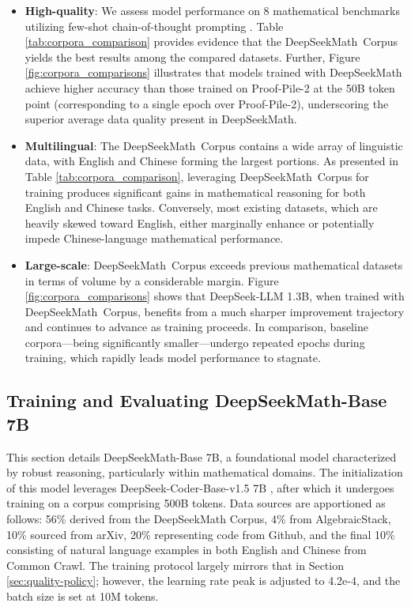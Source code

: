 \begin{itemize}[topsep=0pt]
    \item \textbf{High-quality}:
    We assess model performance on 8 mathematical benchmarks utilizing few-shot chain-of-thought prompting \cite{cot}. Table \ref{tab:corpora_comparison} provides evidence that the DeepSeekMath~Corpus yields the best results among the compared datasets. Further, Figure \ref{fig:corpora_comparisons} illustrates that models trained with DeepSeekMath achieve higher accuracy than those trained on Proof-Pile-2 at the 50B token point (corresponding to a single epoch over Proof-Pile-2), underscoring the superior average data quality present in DeepSeekMath.
    \item \textbf{Multilingual}:
    The DeepSeekMath~Corpus contains a wide array of linguistic data, with English and Chinese forming the largest portions. As presented in Table \ref{tab:corpora_comparison}, leveraging DeepSeekMath~Corpus for training produces significant gains in mathematical reasoning for both English and Chinese tasks. Conversely, most existing datasets, which are heavily skewed toward English, either marginally enhance or potentially impede Chinese-language mathematical performance.
    \item \textbf{Large-scale}:
    DeepSeekMath~Corpus exceeds previous mathematical datasets in terms of volume by a considerable margin. Figure \ref{fig:corpora_comparisons} shows that DeepSeek-LLM 1.3B, when trained with DeepSeekMath~Corpus, benefits from a much sharper improvement trajectory and continues to advance as training proceeds. In comparison, baseline corpora—being significantly smaller—undergo repeated epochs during training, which rapidly leads model performance to stagnate.
\end{itemize}

\subsection{Training and Evaluating DeepSeekMath-Base 7B}

This section details DeepSeekMath-Base 7B, a foundational model characterized by robust reasoning, particularly within mathematical domains. The initialization of this model leverages DeepSeek-Coder-Base-v1.5 7B \citep{deepseek-coder}, after which it undergoes training on a corpus comprising 500B tokens. Data sources are apportioned as follows: 56\% derived from the DeepSeekMath Corpus, 4\% from AlgebraicStack, 10\% sourced from arXiv, 20\% representing code from Github, and the final 10\% consisting of natural language examples in both English and Chinese from Common Crawl. The training protocol largely mirrors that in Section \ref{sec:quality-policy}; however, the learning rate peak is adjusted to 4.2e-4, and the batch size is set at 10M tokens.

